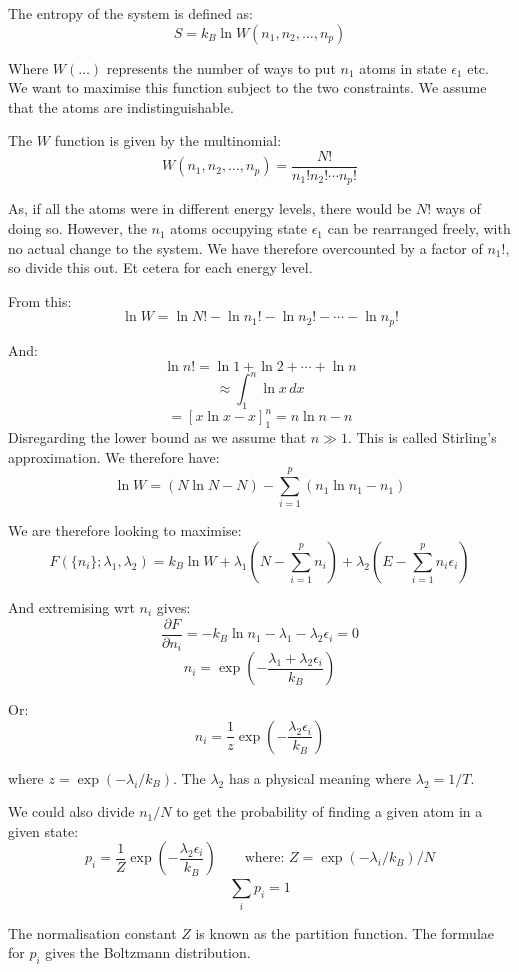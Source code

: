 The entropy of the system is defined as:
\[
    S = k_B \ln W(n_1, n_2, \ldots, n_p)
\]

Where $W(\dots)$ represents the number of ways to put $n_1$ atoms in state $\epsilon_1$ etc. We want to maximise this function subject to the two constraints. We assume that the atoms are indistinguishable.

The $W$ function is given by the multinomial:
\[
    W(n_1, n_2, \ldots, n_p) = \frac{N!}{n_1! n_2! \cdots n_p!}
\]

As, if all the atoms were in different energy levels, there would be $N!$ ways of doing so. However, the $n_1$ atoms occupying state $\epsilon_1$ can be rearranged freely, with no actual change to the system. We have therefore overcounted by a factor of $n_1!$, so divide this out. Et cetera for each energy level.

From this:
\[
    \ln W = \ln N! - \ln n_1! - \ln n_2! - \cdots - \ln n_p!
\]

And:
\[
    \ln n! = \ln 1 + \ln 2 + \cdots + \ln n
\]
\[
    \approx \int_{1}^{n} \ln x \, dx
\]
\[
    = \left[x \ln x - x\right]^n_1 = n \ln n - n
\]
Disregarding the lower bound as we assume that $n \gg 1$. This is called Stirling's approximation. We therefore have:
\[
    \ln W = \left(N \ln N - N\right) - \sum_{i=1}^{p} (n_1 \ln n_1 - n_1)
\]


We are therefore looking to maximise:
\[
    F(\{n_i\}; \lambda_1, \lambda_2) = k_B \ln W + \lambda_1 \left(N - \sum_{i=1}^{p} n_i\right) + \lambda_2 \left(E - \sum_{i=1}^{p} n_i \epsilon_i\right)
\]

And extremising wrt $n_i$ gives:
\[
    \frac{\partial F}{\partial n_i} = -k_B \ln n_1 - \lambda_1 - \lambda_2 \epsilon_i = 0
\]
\[
    n_i = \exp \left(-\frac{\lambda_1 + \lambda_2 \epsilon_i}{k_B}\right)
\]

Or:
\[
    n_i = \frac{1}{z} \exp \left(- \frac{\lambda_2 \epsilon_i}{k_B}\right)
\]

where $z = \exp(-\lambda_i / k_B)$. The $\lambda_2$ has a physical meaning where $\lambda_2 = 1/T$.

We could also divide $n_1 / N$ to get the probability of finding a given atom in a given state:
\[
    p_i = \frac{1}{Z} \exp \left(- \frac{\lambda_2 \epsilon_i}{k_B}\right) \qquad \text{where: } Z = \exp(-\lambda_i / k_B) / N
\]
\[
    \sum_{i}^{} p_i = 1
\]

The normalisation constant $Z$ is known as the partition function. The formulae for ${p_i}$ gives the Boltzmann distribution.

